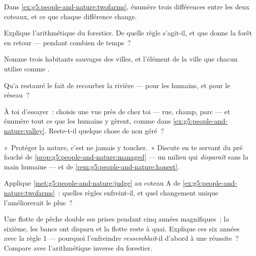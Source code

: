 \begin{exercise}[$\star$]\label{exo:g5:people-and-nature:4}
Dans \cref{ex:g5:people-and-nature:twofarms}, énumère trois
différences entre les deux coteaux, et ce que chaque différence
change.
\end{exercise}

\begin{exercise}[$\star$]\label{exo:g5:people-and-nature:5}
Explique l'arithmétique du forestier. De quelle règle s'agit-il, et
que donne la forêt en retour --- pendant combien de temps~?
\end{exercise}

\begin{exercise}[$\star$]\label{exo:g5:people-and-nature:6}
Nomme trois habitants sauvages des villes, et l'élément de la ville
que chacun utilise comme .
\end{exercise}

\begin{exercise}[$\star$]\label{exo:g5:people-and-nature:7}
Qu'a restauré le fait de recourber la rivière --- pour les humains,
et pour le réseau~?
\end{exercise}

\begin{exercise}[$\star$]\label{exo:g5:people-and-nature:8}
À toi d'essayer~: choisis une vue près de chez toi --- rue, champ,
parc --- et énumère tout ce que les humains y gèrent, comme dans
\cref{ex:g5:people-and-nature:valley}. Reste-t-il quelque chose de
non géré~?
\end{exercise}

\begin{exercise}[$\star\star$]\label{exo:g5:people-and-nature:9}
«~Protéger la nature, c'est ne jamais y toucher.~» Discute en te
servant du pré fauché de
\cref{prop:g5:people-and-nature:managed} --- un milieu qui
\emph{disparaît} sans la main humaine --- et de
\cref{rem:g5:people-and-nature:honest}.
\end{exercise}

\begin{exercise}[$\star\star$]\label{exo:g5:people-and-nature:10}
Applique \cref{met:g5:people-and-nature:judge} au coteau A de
\cref{ex:g5:people-and-nature:twofarms}~: quelles règles
enfreint-il, et quel changement unique l'améliorerait le plus~?
\end{exercise}

\begin{exercise}[$\star\star\star$]\label{exo:g5:people-and-nature:11}
Une flotte de pêche double ses prises pendant cinq années
magnifiques~; la sixième, les bancs ont disparu et la flotte reste à
quai. Explique ces six années avec la règle 1 --- pourquoi
l'enfreindre \emph{ressemblait}-il d'abord à une réussite~? Compare
avec l'arithmétique inverse du forestier.
\end{exercise}
